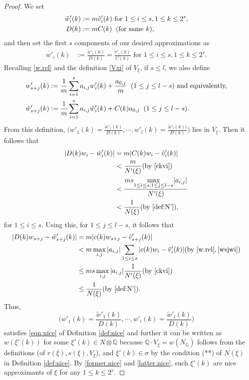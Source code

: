 \documentclass[12pt,a4paper]{amsart}
\theoremstyle{remark}
\theoremstyle{definition}
\def\Q{\mathbb{Q}}
\begin{document}
\begin{proof}
We set 
\begin{align*}
\tilde{w}'_i(k)&:=m\tilde{v}'_i(k) \text{ for }1\le i\le s, 1\le k\le 2^s, \\
D(k)&:=mC(k) \hspace{2mm}(\text{for same } k),
\end{align*}and then set the first $s$ components of our desired approximations as 
\begin{align*}
w'_i(k)&:=\frac{\tilde{w}'_i(k)}{D(k)}=\frac{\tilde{v}'_i(k)}{C(k)}\text{ for }1\le i\le s, 1\le k\le 2^s. 
\end{align*}
Recalling \eqref{w.rel} and the definition \eqref{Vxi} of $V_\xi$, if $s\le l$, 
we also define 
\begin{align}\label{wsjwi}
w'_{s+j}(k)&:=\frac{1}{m}\sum_{i=1}^s a_{i,j} w'_i(k)+\frac{a_{0,j}}{m}\hspace{2mm} 
(1\le j\le l-s) \text{ and equivalently,} \\ 
\tilde{w}'_{s+j}(k)&:=\frac{1}{m}\sum_{i=1}^s a_{i,j} \tilde{w}'_i(k)+C(k)a_{0,j}\hspace{2mm} 
(1\le j\le l-s). 
\end{align}
From this definition, 
$\bigl(w'_1(k)=\frac{\tilde{w}'_{1}(k)}{D(k)},\cdots,w'_l(k)=\frac{\tilde{w}'_{l}(k))}{D(k)}\bigr)$ 
lies in $V_{\xi}$. 
Then it follows that 
\begin{align}
|D(k)w_i-\tilde{w}'_i(k)|&=m|C(k)w_i-\tilde{v}'_i(k)|\\ 
                         &<\frac{m}{N'(\xi)} (\text{by }\eqref{ckvi}) \label{wivi.low}\\ 
                         &<\frac{ms \underset{1\le i\le s,1\le j\le l-s}\max|a_{i,j}|}{N'(\xi)}\\
                         &<\frac{1}{N(\xi)} (\text{by }\eqref{def:N'}),\label{former.nice}
\end{align}
for $1\le i\le s$. Using this, for $1\le j\le l-s$, it follows that 
\begin{align}
|D(k)w_{s+j}-\tilde{w}'_{s+j}(k)|&=m|c(k)w_{s+j}-\tilde{v}'_{s+j}(k)|\\ 
                                 &<m \max_{i,j}|a_{i,j}|\sum_{1\le i\le s}|c(k)w_{i}-\tilde{v}'_{i}(k)| (\text{by }\eqref{w.rel}, \eqref{wsjwi})\\ 
                                 &\le m s \max_{i,j}|a_{i,j}|\frac{1}{N'(\xi)}  (\text{by }\eqref{ckvi}) \\
                                 &\le \frac{1}{N(\xi)} (\text{by }\eqref{def:N'}). \label{latter.nice}
\end{align}
Thus, 
$$\biggl(w'_1(k)=\frac{\tilde{w}'_1(k)}{D(k)},\cdots,w'_l(k)=\frac{\tilde{w}'_l(k)}{D(k)}\biggr)$$ satisfies \eqref{eqn:nice}
of Definition \ref{def:nice} 
and further it can be written as $w(\xi'(k))$ 
for some $\xi'(k)\in N\otimes \Q$ because 
$\Q\cdot V_\xi=w(N_\Q)$ follows from the 
definitions (of $r(\xi), s(\xi), V_\xi$), 
and $\xi'(k)\in \sigma$ 
by the condition (**) of $N(\xi)$ in 
Definition \ref{def:nice}. 
By \eqref{former.nice} and \eqref{latter.nice}, 
such $\xi'(k)$ 
are nice approximants of $\xi$ for any $1\le k\le 2^s$. 


\end{proof}
\end{document}
